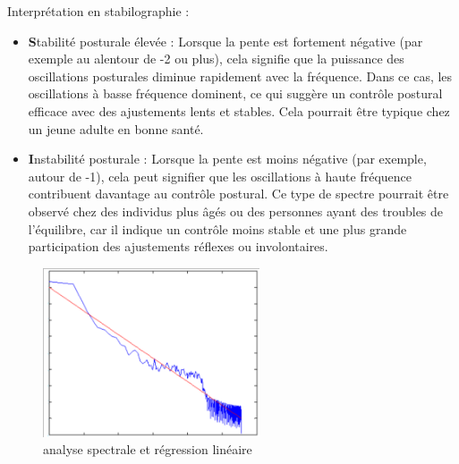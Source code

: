 Interprétation en stabilographie : 
\begin{itemize}
\item \textbf Stabilité posturale élevée : 
Lorsque la pente est fortement négative (par exemple au alentour de -2 ou 
plus), cela signifie que la puissance des oscillations posturales 
diminue rapidement avec la fréquence. Dans ce cas, les oscillations 
à basse fréquence dominent, ce qui suggère un contrôle postural 
efficace avec des ajustements lents et stables. Cela pourrait être 
typique chez un jeune adulte en bonne santé.

\item \textbf Instabilité posturale : Lorsque la pente est moins 
négative (par exemple, autour de -1), cela peut signifier que 
les oscillations à haute fréquence contribuent davantage au 
contrôle postural. Ce type de spectre pourrait être observé chez 
des individus plus âgés ou des personnes ayant des troubles de 
l’équilibre, car il indique un contrôle moins stable et une plus 
grande participation des ajustements réflexes ou involontaires.
\end{itemize}


\begin{figure}[H]
    \centering
        \includegraphics[height=5cm]{images/methode/anaspectrale.png}
        \caption{analyse spectrale et régression linéaire}\label{fig:anaspectrale}
\end{figure}